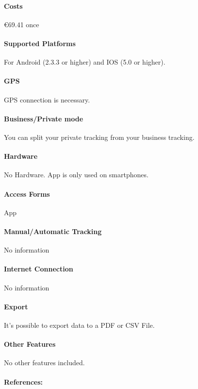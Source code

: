 \paragraph{Costs} \euro 69.41 once
\paragraph{Supported Platforms} For Android (2.3.3 or higher) and IOS (5.0 or higher).
\paragraph{GPS} GPS connection is necessary.
\paragraph{Business/Private mode} You can split your private tracking from your business tracking.
\paragraph{Hardware} No Hardware. App is only used on smartphones.
\paragraph{Access Forms} App
\paragraph{Manual/Automatic Tracking} No information
\paragraph{Internet Connection}No information
\paragraph{Export} It’s possible to export data to a PDF or CSV File.
\paragraph{Other Features} No other features included.
\paragraph{References:} \cite{Electronic_Logbook_from_TOMTOM}
\newpage

